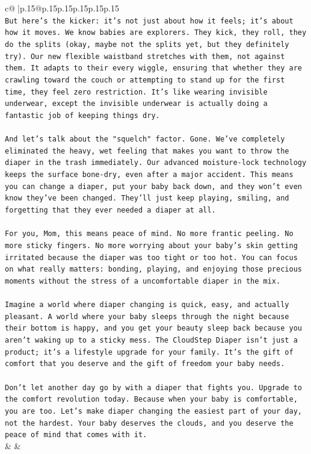 \documentclass{article}
\begin{document}
{\begin{supertabular}{c@{$\;$}|p{.15\linewidth}@{}p{.15\linewidth}p{.15\linewidth}p{.15\linewidth}p{.15\linewidth}p{.15\linewidth}}
{{{\\ 
\texttt{But here's the kicker: it's not just about how it feels; it's about how it moves. We know babies are explorers. They kick, they roll, they do the splits (okay, maybe not the splits yet, but they definitely try). Our new flexible waistband stretches with them, not against them. It adapts to their every wiggle, ensuring that whether they are crawling toward the couch or attempting to stand up for the first time, they feel zero restriction. It's like wearing invisible underwear, except the invisible underwear is actually doing a fantastic job of keeping things dry.} \\
\\ 
\texttt{And let's talk about the "squelch" factor. Gone. We've completely eliminated the heavy, wet feeling that makes you want to throw the diaper in the trash immediately. Our advanced moisture{-}lock technology keeps the surface bone{-}dry, even after a major accident. This means you can change a diaper, put your baby back down, and they won't even know they've been changed. They'll just keep playing, smiling, and forgetting that they ever needed a diaper at all.} \\
\\ 
\texttt{For you, Mom, this means peace of mind. No more frantic peeling. No more sticky fingers. No more worrying about your baby's skin getting irritated because the diaper was too tight or too hot. You can focus on what really matters: bonding, playing, and enjoying those precious moments without the stress of a uncomfortable diaper in the mix.} \\
\\ 
\texttt{Imagine a world where diaper changing is quick, easy, and actually pleasant. A world where your baby sleeps through the night because their bottom is happy, and you get your beauty sleep back because you aren't waking up to a sticky mess. The CloudStep Diaper isn't just a product; it's a lifestyle upgrade for your family. It's the gift of comfort that you deserve and the gift of freedom your baby needs.} \\
\\ 
\texttt{Don't let another day go by with a diaper that fights you. Upgrade to the comfort revolution today. Because when your baby is comfortable, you are too. Let's make diaper changing the easiest part of your day, not the hardest. Your baby deserves the clouds, and you deserve the peace of mind that comes with it.} \\
            }
        }
    }
    & & \\ \\


\end{supertabular}}
\end{document}
